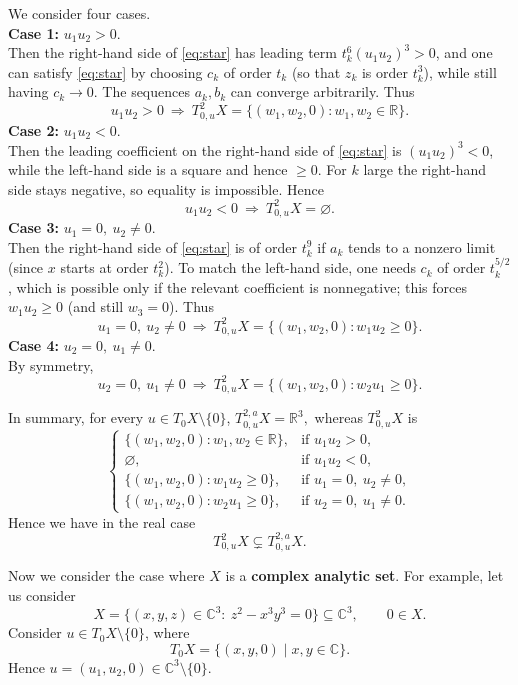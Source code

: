 \documentclass[10pt,reqno]{amsart}
\theoremstyle{break-italic}
\theoremstyle{break-italic}
\theoremstyle{break-italic}
\theoremstyle{break-italic}
\theoremstyle{break-italic}
\theoremstyle{break-italic}
\theoremstyle{break-italic}
\theoremstyle{break-italic}
\theoremstyle{break-roman}
\theoremstyle{standard}
\theoremstyle{varthm-roman}
\theoremstyle{varthm-italic}
\theoremstyle{varthm-roman-break}
\theoremstyle{varthm-italic-break}
\theoremstyle{varthm-roman-no-punctuation}
\theoremstyle{varthm-italic-no-punctuation}
\numberwithin{equation}{section}
\begin{document}
We consider four  cases.\\
{\textbf{Case 1:} \(u_{1}u_{2}>0\).}\\
Then the right-hand side of \eqref{eq:star} has leading term \(t_{k}^{6}(u_{1}u_{2})^{3}>0\), and one can satisfy
\eqref{eq:star} by choosing \(c_{k}\) of order \(t_{k}\) (so that \(z_{k}\) is order \(t_{k}^{3}\)), while still having \(c_{k}\to 0\).
The sequences \(a_{k},b_{k}\) can converge arbitrarily. Thus
\[
u_{1}u_{2}>0 \ \Longrightarrow\
T^{2}_{0,u}X=\{(w_{1},w_{2},0): w_{1},w_{2}\in\mathbb R\}.
\]
{\textbf{Case 2:} \(u_{1}u_{2}<0\).}\\
Then the leading coefficient on the right-hand side of \eqref{eq:star} is \((u_{1}u_{2})^{3}<0\), while the left-hand side is a square and hence \(\ge 0\).
For \(k\) large the right-hand side stays negative, so equality is impossible. Hence
\[
u_{1}u_{2}<0 \ \Longrightarrow\ T^{2}_{0,u}X=\varnothing.
\]
{\textbf{Case 3:} \(u_{1}=0,\ u_{2}\neq 0\).}\\
Then the right-hand side of \eqref{eq:star} is of order \(t_{k}^{9}\) if \(a_{k}\) tends to a nonzero limit (since \(x\) starts at order \(t_{k}^{2}\)).
To match the left-hand side, one needs \(c_{k}\) of order \(t_{k}^{5/2}\), which is possible only if the relevant coefficient is nonnegative; this forces
\(w_{1}u_{2}\ge 0\) (and still \(w_{3}=0\)). Thus
\[
u_{1}=0,\ u_{2}\neq 0 \ \Longrightarrow\
T^{2}_{0,u}X=\{(w_{1},w_{2},0): w_{1}u_{2}\ge 0\}.
\]
{\textbf{Case 4: }\(u_{2}=0,\ u_{1}\neq 0\).}\\
By symmetry,
\[
u_{2}=0,\ u_{1}\neq 0 \ \Longrightarrow\
T^{2}_{0,u}X=\{(w_{1},w_{2},0): w_{2}u_{1}\ge 0\}.
\]

In summary, for every \(u\in T_{0}X\setminus\{0\}\), $T^{2,a}_{0,u}X=\mathbb R^{3},$
whereas \(T^{2}_{0,u}X\) is
\[
\begin{cases}
\{(w_{1},w_{2},0): w_{1},w_{2}\in\mathbb R\}, & \text{if } u_{1}u_{2}>0,\\[2mm]
\varnothing, & \text{if } u_{1}u_{2}<0,\\[2mm]
\{(w_{1},w_{2},0): w_{1}u_{2}\ge 0\}, & \text{if } u_{1}=0,\ u_{2}\neq 0,\\[2mm]
\{(w_{1},w_{2},0): w_{2}u_{1}\ge 0\}, & \text{if } u_{2}=0,\ u_{1}\neq 0.
\end{cases}
\]
Hence we have in the real case
\[
T^{2}_{0,u}X \subsetneq T^{2,a}_{0,u}X.
\]

Now we consider the case where $X$ is a \textbf{complex analytic set}. For example, let us consider
\[
X=\bigl\{(x,y,z)\in\mathbb C^3:\ z^{2}-x^{3}y^{3}=0\bigr\}\subseteq\mathbb C^3,\qquad 0\in X.
\]
Consider \(u\in T_{0}X\setminus\{0\}\), where 
\[
T_{0}X=\{(x,y,0)\mid x,y\in \mathbb C\}.
\]
Hence \(u=(u_{1},u_{2},0)\in\mathbb C^{3}\setminus\{0\}\).
\end{document}
